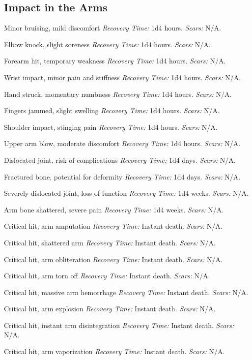 \documentclass[12pt]{book}  %
\begin{document}
\subsection{Impact in the Arms}

\begin{description}[labelwidth=1.5em, leftmargin=*, itemsep=0.4em]
    \item[1 -] Minor bruising, mild discomfort \textit{Recovery Time:} 1d4 hours. \textit{Scars:} N/A.
    \item[2 -] Elbow knock, slight soreness \textit{Recovery Time:} 1d4 hours. \textit{Scars:} N/A.
    \item[3 -] Forearm hit, temporary weakness \textit{Recovery Time:} 1d4 hours. \textit{Scars:} N/A.
    \item[4 -] Wrist impact, minor pain and stiffness \textit{Recovery Time:} 1d4 hours. \textit{Scars:} N/A.
    \item[5 -] Hand struck, momentary numbness \textit{Recovery Time:} 1d4 hours. \textit{Scars:} N/A.
    \item[6 -] Fingers jammed, slight swelling \textit{Recovery Time:} 1d4 hours. \textit{Scars:} N/A.
    \item[7 -] Shoulder impact, stinging pain \textit{Recovery Time:} 1d4 hours. \textit{Scars:} N/A.
    \item[8 -] Upper arm blow, moderate discomfort \textit{Recovery Time:} 1d4 hours. \textit{Scars:} N/A.
    \item[9 -] Dislocated joint, risk of complications \textit{Recovery Time:} 1d4 days. \textit{Scars:} N/A.
    \item[10 -] Fractured bone, potential for deformity \textit{Recovery Time:} 1d4 days. \textit{Scars:} N/A.
    \item[11 -] Severely dislocated joint, loss of function \textit{Recovery Time:} 1d4 weeks. \textit{Scars:} N/A.
    \item[12 -] Arm bone shattered, severe pain \textit{Recovery Time:} 1d4 weeks. \textit{Scars:} N/A.
    \item[13 -] Critical hit, arm amputation \textit{Recovery Time:} Instant death. \textit{Scars:} N/A.
    \item[14 -] Critical hit, shattered arm \textit{Recovery Time:} Instant death. \textit{Scars:} N/A.
    \item[15 -] Critical hit, arm obliteration \textit{Recovery Time:} Instant death. \textit{Scars:} N/A.
    \item[16 -] Critical hit, arm torn off \textit{Recovery Time:} Instant death. \textit{Scars:} N/A.
    \item[17 -] Critical hit, massive arm hemorrhage \textit{Recovery Time:} Instant death. \textit{Scars:} N/A.
    \item[18 -] Critical hit, arm explosion \textit{Recovery Time:} Instant death. \textit{Scars:} N/A.
    \item[19 -] Critical hit, instant arm disintegration \textit{Recovery Time:} Instant death. \textit{Scars:} N/A.
    \item[20 -] Critical hit, arm vaporization \textit{Recovery Time:} Instant death. \textit{Scars:} N/A.
\end{description}
\end{document}
